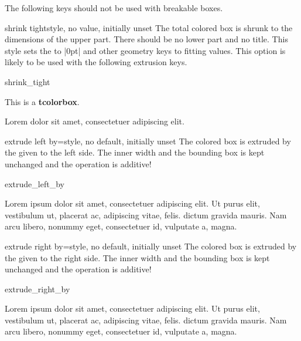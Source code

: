 \begin{marker}
The following keys should not be used with breakable boxes.
\end{marker}

\begin{docTcbKey}{shrink tight}{}{style, no value, initially unset}
  The total colored box is shrunk to the dimensions of the upper
  part. There should be no lower part and no title.
  This style sets the  to |0pt| and other geometry keys
  to fitting values. This option is likely to be used with the following
  extrusion keys.
\begin{exdispExample}{shrink_tight}

\begin{tcolorbox}
This is a \textbf{tcolorbox}.
\end{tcolorbox}

Lorem  dolor sit amet, consectetuer adipiscing elit.
\end{exdispExample}
\end{docTcbKey}

\begin{docTcbKey}[][doc updated=2014-09-19]{extrude left by}{=}{style, no default, initially unset}
  The colored box is extruded by the given  to the left side.
  The inner width and the bounding box is kept unchanged and the operation
  is additive!
\begin{exdispExample}{extrude_left_by}

Lorem ipsum dolor sit amet, consectetuer adipiscing elit. Ut purus elit,
vestibulum ut, placerat ac, adipiscing vitae, felis.
 dictum gravida mauris.
Nam arcu libero, nonummy eget, consectetuer id, vulputate a, magna.
\end{exdispExample}
\end{docTcbKey}

\begin{docTcbKey}[][doc updated=2014-09-19]{extrude right by}{=}{style, no default, initially unset}
  The colored box is extruded by the given  to the right side.
  The inner width and the bounding box is kept unchanged and the operation
  is additive!
\begin{exdispExample}{extrude_right_by}

Lorem ipsum dolor sit amet, consectetuer adipiscing elit. Ut purus elit,
vestibulum ut, placerat ac, adipiscing vitae, felis.
 dictum gravida mauris.
Nam arcu libero, nonummy eget, consectetuer id, vulputate a, magna.
\end{exdispExample}
\end{docTcbKey}

